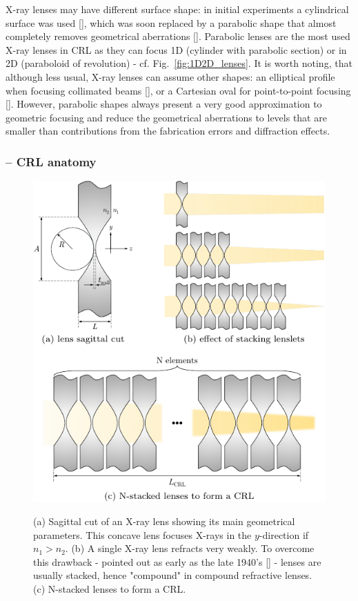 \begin{refsection}
X-ray lenses may have different surface shape: in initial experiments a cylindrical surface was used [\cite{Snigirev1996, Protopopov1998}], which was soon replaced by a parabolic shape that almost completely removes geometrical aberrations [\cite{Elleaume1998, Lengeler1999}]. Parabolic lenses are the most used X-ray lenses in CRL as they can focus 1D (cylinder with parabolic section) or in 2D (paraboloid of revolution) - cf. Fig.~\ref{fig:1D2D_lenses}. It is worth noting, that although less usual, X-ray lenses can assume other shapes: an elliptical profile when focusing collimated beams [\cite{Evans-Lutterodt2003}], or a Cartesian oval for point-to-point focusing [\cite{SanchezdelRio2012}]. However, parabolic shapes always present a very good approximation to geometric focusing and reduce the geometrical aberrations to levels that are smaller than contributions from the fabrication errors and diffraction effects.


\subsubsection*{-- CRL anatomy}

\begin{figure}[t]
    \centering
    {\includegraphics[width=0.5\linewidth]{figures/ch03/anatomy.pdf}}
    \caption[CRL anatomy]{(a) Sagittal cut of an X-ray lens showing its main geometrical parameters. This concave lens focuses X-rays in the $y$-direction if $n_1>n_2$. (b) A single X-ray lens refracts very weakly. To overcome this drawback - pointed out as early as the late 1940's [\cite{Kirkpatrick1948}] - lenses are usually stacked, hence "compound" in compound refractive lenses. (c) N-stacked lenses to form a CRL.}
    \label{fig:CRLs}
\end{figure}


\end{refsection}
